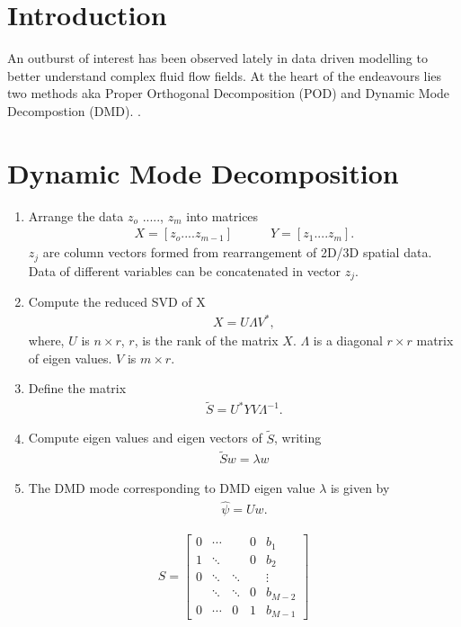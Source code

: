 \documentclass{article}
\begin{document}
\section*{Introduction}
An outburst of interest has been observed lately in data driven modelling to better understand complex fluid flow fields. At the heart of the endeavours lies two methods aka Proper Orthogonal Decomposition (POD) and Dynamic Mode Decompostion (DMD). \citep{bagheri_jfm2013,liu_ExpF_2015}.  
\section*{Dynamic Mode Decomposition}
\begin{enumerate}
  \item Arrange the data {$z_o$ ....., $z_{m}$} into matrices
    \begin{align*}
        X  = [z_o .... z_{m-1}] \quad \quad \quad Y =[z_1 .... z_m].
    \end{align*}
        $z_j$ are column vectors formed from rearrangement of 2D/3D spatial data. Data of different variables can be concatenated in vector $z_j$.
  \item Compute the reduced SVD of X
      \begin{align*}      X = U\Lambda V^{*},        \end{align*}
  where, $U$ is $n \times r$, $r$, is the rank of the matrix $X$. $\Lambda$ is a diagonal $r \times r$ matrix of eigen values. $V$ is $m \times r$.
  \item Define the matrix 
    \begin{align*} \tilde{S} = U^{*}YV\Lambda^{-1}. \end{align*}
  \item Compute eigen values and eigen vectors of $\tilde{S}$, writing
    \begin{align*} \tilde{S}w = \lambda w \end{align*}
   \item The DMD mode corresponding to DMD eigen value $\lambda$ is given by
   \begin{align*}  \hat{\psi} = Uw.\end{align*}
\end{enumerate}
\begin{align}
S =
    \begin{bmatrix}
        0 & \cdots &        & 0  & b_1\\
        1 & \ddots &        & 0  & b_2 \\
        0 & \ddots & \ddots &    & \vdots \\
          & \ddots & \ddots & 0  & b_{M-2} \\
        0 & \cdots & 0      & 1  & b_{M-1}
    \end{bmatrix}
\end{align}

\clearpage


\end{document}
